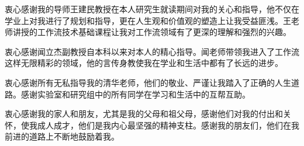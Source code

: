 
\begin{acknowledgement}


  衷心感谢我的导师王建民教授在本人研究生就读期间对我的关心和指导，他不仅在学业上对我进行了规划和指导，更在人生观和价值观的塑造上让我受益匪浅。王老师讲授的工作流技术基础课程让我对工作流领域有了更深的理解和强烈的兴趣。

  衷心感谢闻立杰副教授自本科以来对本人的精心指导。闻老师带领我进入了工作流这样无限精彩的领域，他的言传身教使我在学业和生活中都有了长远的进步。

  衷心感谢所有无私指导我的清华老师，他们的敬业、严谨让我踏入了正确的人生道路。感谢实验室和研究组中的所有同学在学习和生活中的互帮互助。

  衷心感谢我的家人和朋友，尤其是我的父母和祖父母，感谢他们对我的付出和关怀，使我成人成才，他们是我内心最坚强的精神支柱。感谢我的朋友们，他们在我前进的道路上不断地鼓励着我。
\end{acknowledgement}
